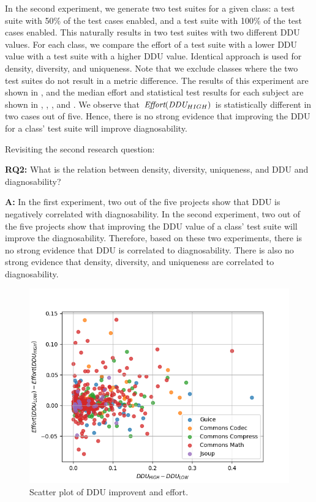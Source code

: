 \documentclass[twoside,a4paper,11pt]{memoir}
\begin{document}
In the second experiment, we generate two test suites for a given class: a test suite with 50\% of the test cases enabled, and a test suite with 100\% of the test cases enabled.
This naturally results in two test suites with two different DDU values.
For each class, we compare the effort of a test suite with a lower DDU value with a test suite with a higher DDU value.
Identical approach is used for density, diversity, and uniqueness.
Note that we exclude classes where the two test suites do not result in a metric difference.
The results of this experiment are shown in , and the median effort and statistical test results for each subject are shown in , , , and .
We observe that $\emph{Effort}(\emph{DDU}_{HIGH})$ is statistically different in two cases out of five.
Hence, there is no strong evidence that improving the DDU for a class' test suite will improve diagnosability.

Revisiting the second research question:
\begin{framed}
\noindent
\textbf{RQ2:} What is the relation between density, diversity, uniqueness, and DDU and diagnosability?
\end{framed}
\textbf{A:} In the first experiment, two out of the five projects show that DDU is negatively correlated with diagnosability.
In the second experiment, two out of the five projects show that improving the DDU value of a class' test suite will improve the diagnosability.
Therefore, based on these two experiments, there is no strong evidence that DDU is correlated to diagnosability.
There is also no strong evidence that density, diversity, and uniqueness are correlated to diagnosability.

\begin{figure}
  \includegraphics[width=\linewidth]{figures/delta_ddu_delta_effort}
  \caption{Scatter plot of DDU improvent and effort.}
  \label{fig:delta_effort}
\end{figure}
\end{document}
